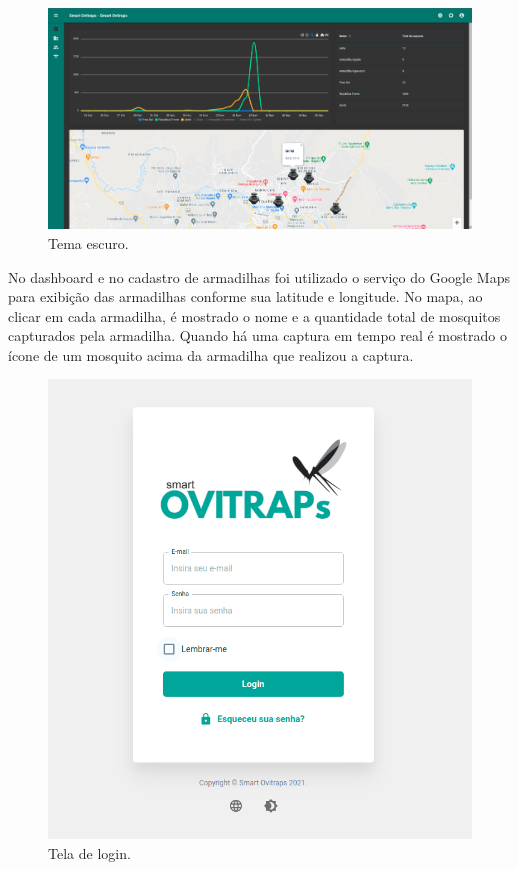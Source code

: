 \documentclass[
	12pt,				%
	openright,			%
	oneside,			%
	a4paper,			%
	chapter=TITLE,		%
	english,			%
	brazil				%
	]{abntex2}
\begin{document}
\begin{figure}[H]
    \centering
    \includegraphics[scale=0.20]{imagens/front_2.png}
    \caption{Tema escuro.}
        \label{fig:dark}
    \end{figure}

No dashboard e no cadastro de armadilhas foi utilizado o serviço do Google Maps \cite{ReactGoogleMaps}
para exibição das armadilhas conforme sua latitude e longitude. No mapa, ao clicar em cada armadilha, é mostrado o nome e a 
quantidade total de mosquitos capturados pela armadilha.
Quando há uma captura em tempo real é mostrado o ícone de um mosquito acima da armadilha que realizou a captura.

\begin{figure}[H]
    \centering
    \includegraphics[scale=0.5]{imagens/front_5.png}
    \caption{Tela de login.}
        \label{fig:login}
    \end{figure}
\end{document}

